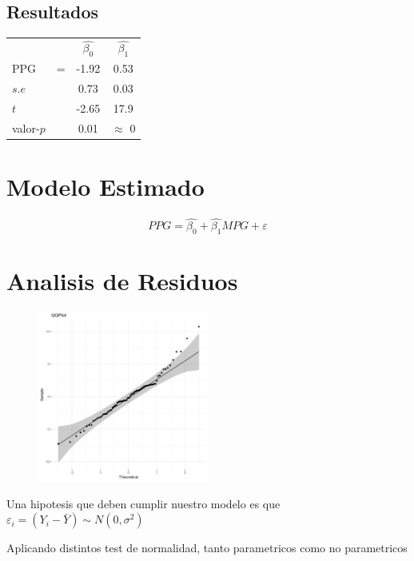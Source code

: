 \documentclass[onecolumn]{IEEEtran}
\begin{document}
    \subsection*{Resultados}
    \begin{table}[h]
        \centering
        \begin{tabular}{l l c c}
            & & $\hat{\beta_0}$ & $\hat{\beta_1}$ \\
            PPG & = & -1.92 & 0.53 \\
            $s.e$ &  & 0.73 & 0.03 \\
            $t$ & & -2.65 & 17.9 \\
            valor-$p$ & & 0.01 & $\approx$ 0
        \end{tabular}
    \end{table}
    
    \section{Modelo Estimado}
    
    \begin{equation}
        PPG = \hat{\beta_0} + \hat{\beta_1} MPG + \varepsilon        
    \end{equation}
    
    \section{Analisis de Residuos}
    \begin{figure}[ht]
        \centering
       \includegraphics[width=0.5\textwidth]{../plot2.png}
    \end{figure}
    Una hipotesis que deben cumplir nuestro modelo es que $\varepsilon_i = (Y_i - \bar{Y}) \sim N(0, \sigma^2)$

    Aplicando distintos test de normalidad, tanto parametricos como no parametricos
    
\end{document}
